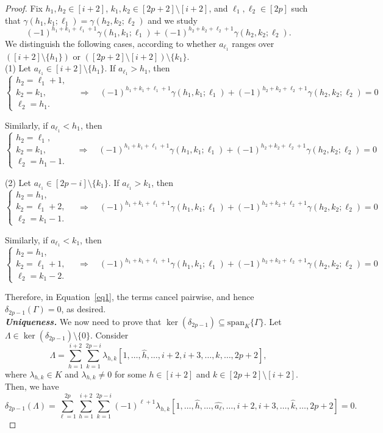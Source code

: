 \documentclass[12pt]{amsart}
\begin{document}
\begin{proof}
Fix $h_1,h_2 \in [i+2]$, $k_1,k_2 \in [2p+2]\setminus[i+2]$, and $\ell_1,\ell_2 \in [2p]$ such that $\gamma(h_1,k_1;\ell_1)=\gamma(h_2,k_2;\ell_2)$ and we study 
$$
(-1)^{h_1+k_1+\ell_1+1}\gamma(h_1,k_1;\ell_1)
+
(-1)^{h_2+k_2+\ell_2+1}\gamma(h_2,k_2;\ell_2).
$$
We distinguish the following cases, according to whether $a_{\ell_1}$ ranges over $([i+2]\setminus\{h_1\})$ or $([2p+2]\setminus[i+2])\setminus\{k_1\}$.\\

(1) Let $a_{\ell_1} \in [i+2]\setminus \{h_1\}$. If $a_{\ell_1} > h_1$, then
\[
\begin{cases}
h_2 = \ell_1 + 1, \\
k_2 = k_1, \\
\ell_2 = h_1.
\end{cases}
\quad \Rightarrow \quad
(-1)^{h_1+k_1+\ell_1+1}\gamma(h_1,k_1;\ell_1)
+
(-1)^{h_2+k_2+\ell_2+1}\gamma(h_2,k_2;\ell_2)=0
\]

Similarly, if $a_{\ell_1} < h_1$, then
\[
\begin{cases}
h_2 = \ell_1, \\
k_2 = k_1, \\
\ell_2 = h_1 - 1.
\end{cases}
\quad \Rightarrow \quad
(-1)^{h_1+k_1+\ell_1+1}\gamma(h_1,k_1;\ell_1)
+
(-1)^{h_2+k_2+\ell_2+1}\gamma(h_2,k_2;\ell_2)=0
\]

(2) Let $a_{\ell_1} \in [2p-i]\setminus \{k_1\}$. If $a_{\ell_1} > k_1$, then
\[
\begin{cases}
h_2 = h_1, \\
k_2 = \ell_1 + 2, \\
\ell_2 = k_1-1.
\end{cases}
\quad \Rightarrow \quad
(-1)^{h_1+k_1+\ell_1+1}\gamma(h_1,k_1;\ell_1)
+
(-1)^{h_2+k_2+\ell_2+1}\gamma(h_2,k_2;\ell_2)=0
\]

Similarly, if $a_{\ell_1} < k_1$, then
\[
\begin{cases}
h_2 = h_1, \\
k_2 = \ell_1+1, \\
\ell_2 = k_1 - 2.
\end{cases}
\quad \Rightarrow \quad
(-1)^{h_1+k_1+\ell_1+1}\gamma(h_1,k_1;\ell_1)
+
(-1)^{h_2+k_2+\ell_2+1}\gamma(h_2,k_2;\ell_2)=0
\]

Therefore, in Equation~\eqref{eq1}, the terms cancel pairwise, and hence $\delta_{2p-1}(\Gamma)=0$, as desired.\\


\textbf{\textit{Uniqueness.}} We now need to prove that $\ker(\delta_{2p-1})\subseteq \mathrm{span}_K\{\Gamma\}$.  Let $\Lambda\in \ker(\delta_{2p-1})\setminus\{0\}$.  Consider 
$$ \Lambda=\sum_{h=1}^{i+2} \sum_{k=1}^{2p-i}\lambda_{h,k}\left[1,\dots,\widehat{h},\dots,i+2,i+3,\dots,\widehat{k},\dots,2p+2 \right],$$
where $\lambda_{h,k}\in K$ and $\lambda_{h,k}\neq 0$ for some $h\in [i+2]$ and $k\in[2p+2]\setminus[i+2]$. Then, we have
\begin{equation}\label{eq2}
\delta_{2p-1}(\Lambda)=\sum_{\ell=1}^{2p} \sum_{h=1}^{i+2} \sum_{k=1}^{2p-i} (-1)^{\ell+1} \lambda_{h,k}
\left[1,\dots,\widehat{h},\dots, \widehat{a_\ell},\dots,i+2,i+3,\dots,\widehat{k},\dots,2p+2 \right]=0.
\end{equation}


\end{proof}
\end{document}
